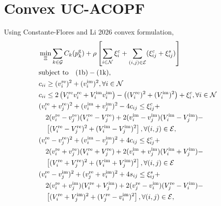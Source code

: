 \documentclass[11pt,twoside]{article}
\begin{document}
\section{Convex UC-ACOPF}
Using Constante-Flores and Li 2026 convex formulation,
\begin{subequations}
	\begin{align}
		& \min_{\Xi} \sum_{k \in \mathcal{G}} C_k(p_k^{\text{g}}) + \rho \left[ \sum_{i \in \mathcal{N}} \xi_i^c + \sum_{(i,j) \in \mathcal{E}} (\xi_{ij}^c + \xi_{ij}^s) \right] \\
		& \text{subject to} \quad (1\text{b}) - (1\text{k}), \notag \\
		& c_{ii} \geq (v_i^{\text{re}})^2 + (v_i^{\text{im}})^2, \forall i \in \mathcal{N} \\
		& c_{ii} \leq 2 \left( V_i^{\text{re}} v_i^{\text{re}} + V_i^{\text{im}} v_i^{\text{im}} \right) - \left( (V_i^{\text{re}})^2 + (V_i^{\text{im}})^2 \right) + \xi_i^c, \forall i \in \mathcal{N}\\
		& (v_i^{\text{re}} + v_j^{\text{re}})^2 + (v_i^{\text{im}} + v_j^{\text{im}})^2 - 4c_{ij} \leq \xi_{ij}^c + \notag \\
		& \quad 2(v_i^{\text{re}} - v_j^{\text{re}})(V_i^{\text{re}} - V_j^{\text{re}}) + 2(v_i^{\text{im}} - v_j^{\text{im}})(V_i^{\text{im}} - V_j^{\text{im}}) - \notag \\
		& \quad \left[ (V_i^{\text{re}} - V_j^{\text{re}})^2 + (V_i^{\text{im}} - V_j^{\text{im}})^2 \right], \forall (i, j) \in \mathcal{E}, \\
		& (v_i^{\text{re}} - v_j^{\text{re}})^2 + (v_i^{\text{im}} - v_j^{\text{im}})^2 + 4c_{ij} \leq \xi_{ij}^c + \notag \\
		& \quad 2(v_i^{\text{re}} + v_j^{\text{re}})(V_i^{\text{re}} + V_j^{\text{re}}) + 2(v_i^{\text{im}} + v_j^{\text{im}})(V_i^{\text{im}} + V_j^{\text{im}}) - \notag \\
		& \quad \left[ (V_i^{\text{re}} + V_j^{\text{re}})^2 + (V_i^{\text{im}} + V_j^{\text{im}})^2 \right], \forall (i, j) \in \mathcal{E} \\
		& (v_i^{\text{re}} - v_j^{\text{im}})^2 + (v_j^{\text{re}} + v_i^{\text{im}})^2 + 4s_{ij} \leq \xi_{ij}^s + \notag \\
		& \quad 2(v_i^{\text{re}} + v_j^{\text{im}})(V_i^{\text{re}} + V_j^{\text{im}}) + 2(v_j^{\text{re}} - v_i^{\text{im}})(V_j^{\text{re}} - V_i^{\text{im}}) - \notag \\
		& \quad \left[ (V_i^{\text{re}} + V_j^{\text{im}})^2 + (V_j^{\text{re}} - v_i^{\text{im}})^2 \right], \forall (i, j) \in \mathcal{E},\\

\end{align}
\end{subequations}
\end{document}
